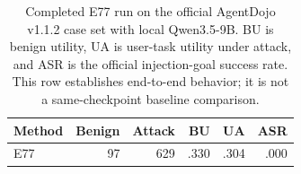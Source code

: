 \begin{table}[t]
\centering
\small
\caption{Completed E77 run on the official AgentDojo v1.1.2 case set with local Qwen3.5-9B. BU is benign utility, UA is user-task utility under attack, and ASR is the official injection-goal success rate. This row establishes end-to-end behavior; it is not a same-checkpoint baseline comparison.}
\label{tab:e77-agentdojo}
\begin{tabular}{lrrrrr}
\toprule
Method & Benign & Attack & BU & UA & ASR \\
\midrule
\sys{} E77 & 97 & 629 & .330 & .304 & .000 \\
\bottomrule
\end{tabular}
\end{table}
